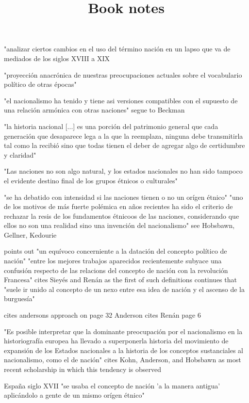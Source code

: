 \documentclass[12pt]{article}
\title{Book notes}
\makeatletter
\newcommand\iraggedright{%
	\let\\\@centercr\@rightskip\@flushglue \rightskip\@rightskip
	\leftskip\z@skip}
\makeatother
\begin{document}
	\makeheader
	\iraggedright
	

"analizar ciertos cambios en el uso del término nación en un lapso que va de mediados de los siglos XVIII a XIX \cite[27]{Chiaramonte2004}

"proyección anacrónica de nuestras preocupaciones actuales sobre el vocabulario político de otras épocas" \cite[28]{Chiaramonte2004}

"el nacionalismo ha tenido y tiene asi versiones compatibles con el supuesto de una relación armónica con otras naciones" \cite[28]{Chiaramonte2004} segue to Beckman

"la historia nacional [...] es una porción del patrimonio general que cada generación que desaparece lega a la que la reemplaza, ninguna debe transmitirla tal como la recibió sino que todas tienen el deber de agregar algo de certidumbre y claridad" \cite[28]{Chiaramonte2004}

"Las naciones no son algo natural, y los estados nacionales no han sido tampoco el evidente destino final de los grupos étnicos o culturales" \cite[][Gellner in]{Chiaramonte}

"se ha debatido con intensidad si las naciones tienen o no un orígen étnico" \cite[30]{Chiaramonte2004}
"uno de los motivos de más fuerte polémica en años recientes ha sido el criterio de rechazar la resis de los fundamentos étnicoos de las naciones, considerando que ellos no son una realidad sino una invención del nacionalismo"
see Hobsbawn, Gellner, Kedourie

points out "un equívoco concerniente a la datación del concepto político de nación"
"entre los mejores trabajos aparecidos recientemente subyace una confusión respecto de las relacions del concepto de nación con la revolución Francesa" \cite[31]{Chiaramonte2004}
cites Sieyés and Renán as the first of such definitions
continues that "suele ir unido al concepto de un nexo entre esa idea de nación y el ascenso de la burguesía" \cite[32]{Chiaramonte2004}

cites andersons approach on page 32
Anderson cites Renán page 6

"Es posible interpretar que la dominante preocupación por el nacionalismo en la historiografía europea ha llevado a superponerla historia del movimiento de expansión de los Estados nacionales a la historia de los conceptos sustanciales al nacionalismo, como el de nación"
cites Kohn, Anderson, and Hobsbawn as most recent scholarship in which this tendency is observed

España siglo XVII "se usaba el concepto de nación 'a la manera antigua' aplicándolo a gente de un mismo orígen étnico"
\end{document}
